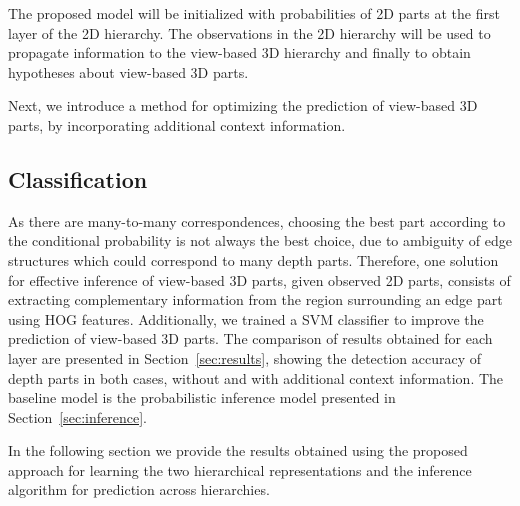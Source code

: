 \documentclass[runningheads]{llncs}
\begin{document}
The proposed model will be initialized with probabilities of 2D parts at the first layer of the 2D hierarchy. The observations in the 2D hierarchy will be used to propagate information to the view-based 3D hierarchy and finally to obtain hypotheses about view-based 3D parts. 

Next, we introduce a method for optimizing the prediction of view-based 3D parts, by incorporating additional context information.

\subsection{Classification}

As there are many-to-many correspondences, choosing the best part according to the conditional probability is not always the best choice, due to ambiguity of edge structures which could correspond to many depth parts. Therefore, one solution for effective inference of view-based 3D parts, given observed 2D parts, consists of extracting complementary information from the region surrounding an edge part using HOG features. Additionally, we trained a SVM classifier to improve the prediction of view-based 3D parts. 
The comparison of results obtained for each layer are presented in Section~\ref{sec:results}, showing the detection accuracy of depth parts in both cases, without and with additional context information. The baseline model is the probabilistic inference model presented in Section~\ref{sec:inference}.

%

In the following section we provide the results obtained using the proposed approach for learning the two hierarchical representations and the inference algorithm for prediction across hierarchies.
\end{document}
